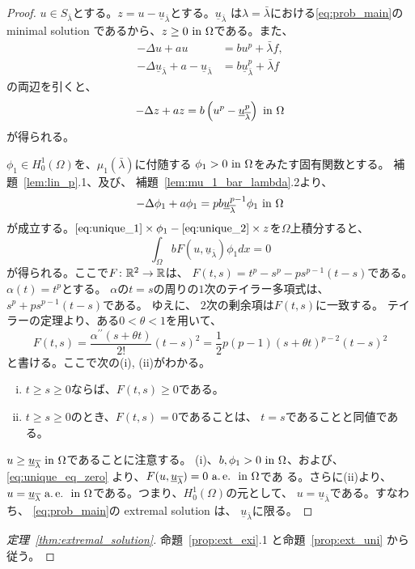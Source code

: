 \begin{proof}
 $u \in S_{\bar{\lambda}}$とする。$z = u -
 \underline{u}_{\bar{\lambda}}$とする。$\underline{u}_{\bar{\lambda}}$
 は$\lambda = \bar{\lambda}$における\ref{eq:prob_main}の
 minimal solution であるから、$z \geq 0 ~\text{in}~ \Omega$である。また、
 \begin{align*}
  -\Delta u + au &= bu^p + \bar{\lambda} f, \\
  -\Delta \underline{u}_{\bar{\lambda}} + a
  -\underline{u}_{\bar{\lambda}}
  &= b \underline{u}_{\bar{\lambda}}^p + \bar{\lambda} f
 \end{align*}
 の両辺を引くと、
 \begin{equation}
  -\Delta z + az = b \left( u^p - \underline{u}_{\overline{\lambda}}^p
 \right) ~\text{in}~ \Omega \label{eq:unique_1}
 \end{equation}
 が得られる。
 
 $\phi_1 \in H_0^1(\Omega)$を、$\mu_1(\bar{\lambda})$に付随する
 $\phi_1 > 0 ~\text{in}~ \Omega$をみたす固有関数とする。
 補題~\ref{lem:lin_p}.1、及び、
 補題~\ref{lem:mu_1_bar_lambda}.2より、
 \begin{equation}
  -\Delta \phi_1 + a\phi_1 = pb \underline{u}_{\overline{\lambda}}^{p-1}
   \phi_1 ~\text{in}~ \Omega \label{eq:unique_2}
 \end{equation}
 が成立する。$\text{\eqref{eq:unique_1}} \times \phi_1 -
 \text{\eqref{eq:unique_2}} \times z$を$\Omega$上積分すると、
 \begin{equation}
  \int_\Omega b F(u, \underline{u}_{\bar{\lambda}}) \phi_1 dx = 0
   \label{eq:unique_eq_zero}
 \end{equation}
 が得られる。ここで$F \colon \mathbb{R}^2 \to \mathbb{R}$は、
 $F(t, s) = t^p - s^p - ps^{p-1}(t-s)$である。
 $\alpha(t) = t^p$とする。
 $\alpha$の$t = s$の周りの$1$次のテイラー多項式は、
 $s^p + ps^{p-1}(t-s)$である。
 ゆえに、
 $2$次の剰余項は$F(t, s)$に一致する。
 テイラーの定理より、ある$0 < \theta < 1$を用いて、
 \[
  F(t, s) = \frac{\alpha^{\prime\prime}(s + \theta t)}{2!} (t-s)^2 = \frac{1}{2}
 p(p-1) (s+ \theta t)^{p-2} (t-s)^2
 \]
 と書ける。ここで次の(i), (ii)がわかる。
 \begin{enumerate}[(i)]
  \item $t \geq s \geq 0$ならば、$F(t, s) \geq 0$である。
  \item $t \geq s \geq 0$のとき、$F(t, s) = 0$であることは、
        $t = s$であることと同値である。
 \end{enumerate}
 $u \geq \underline{u}_{\overline{\lambda}} ~\text{in}~ \Omega$であることに注意する。
 (i)、$b, \phi_1 > 0 ~\text{in}~ \Omega$、および、\eqref{eq:unique_eq_zero}
 より、$F(u, \underline{u}_{\overline{\lambda}}) = 0 ~\text{a.\,e.}~ ~\text{in}~ \Omega$であ
 る。さらに(ii)より、$u = \underline{u}_{\overline{\lambda}} ~\text{a.\,e.}~ ~\text{in}~
 \Omega$である。つまり、$H_0^1(\Omega)$の元として、
 $u = \underline{u}_{\bar{\lambda}}$である。すなわち、
 \ref{eq:prob_main}の extremal solution は、
 $\underline{u}_{\bar{\lambda}}$に限る。 \qedhere
\end{proof}

\begin{proof}[定理~\ref{thm:extremal_solution}]
 命題~\ref{prop:ext_exi}.1 と命題~\ref{prop:ext_uni} から従う。\qedhere
\end{proof}


